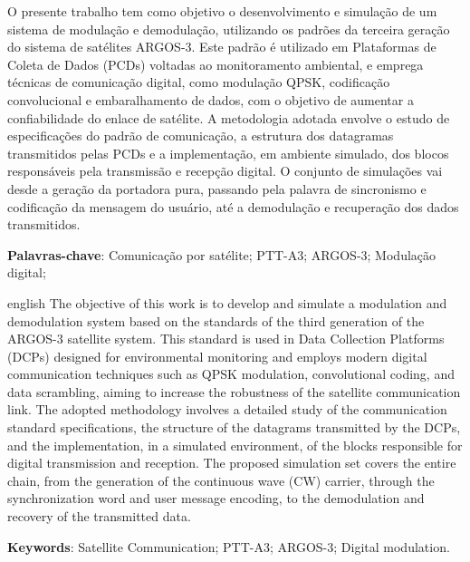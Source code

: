 \setlength{\absparsep}{18pt} 


\begin{resumo}
O presente trabalho tem como objetivo o desenvolvimento e simulação de um sistema de modulação e demodulação, utilizando os padrões da terceira geração do sistema de satélites ARGOS-3. Este padrão é utilizado em Plataformas de Coleta de Dados (PCDs) voltadas ao monitoramento ambiental, e emprega técnicas de comunicação digital, como modulação QPSK, codificação convolucional e embaralhamento de dados, com o objetivo de aumentar a confiabilidade do enlace de satélite. A metodologia adotada envolve o estudo de especificações do padrão de comunicação, a estrutura dos datagramas transmitidos pelas PCDs e a implementação, em ambiente simulado, dos blocos responsáveis pela transmissão e recepção digital. O conjunto de simulações vai desde a geração da portadora pura, passando pela palavra de sincronismo e codificação da mensagem do usuário, até a demodulação e recuperação dos dados transmitidos. 

    \textbf{Palavras-chave}: Comunicação por satélite; PTT-A3; ARGOS-3; Modulação digital;
\end{resumo}



\begin{resumo}[Abstract]
\begin{otherlanguage*}{english}
The objective of this work is to develop and simulate a modulation and demodulation system based on the standards of the third generation of the ARGOS-3 satellite system. This standard is used in Data Collection Platforms (DCPs) designed for environmental monitoring and employs modern digital communication techniques such as QPSK modulation, convolutional coding, and data scrambling, aiming to increase the robustness of the satellite communication link. The adopted methodology involves a detailed study of the communication standard specifications, the structure of the datagrams transmitted by the DCPs, and the implementation, in a simulated environment, of the blocks responsible for digital transmission and reception. The proposed simulation set covers the entire chain, from the generation of the continuous wave (CW) carrier, through the synchronization word and user message encoding, to the demodulation and recovery of the transmitted data.
\vspace{\onelineskip}

\noindent 
\textbf{Keywords}: Satellite Communication; PTT-A3; ARGOS-3; Digital modulation.
\end{otherlanguage*}
\end{resumo}
